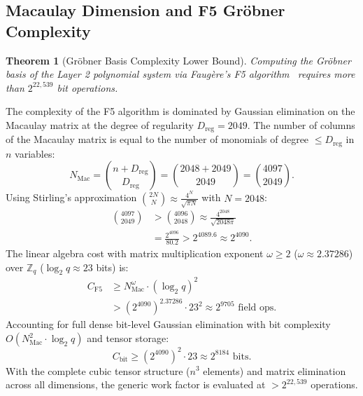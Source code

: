 \documentclass{ieeeaccess}
\newcommand{\Z}{\mathbb{Z}}
\newtheorem{theorem}{Theorem}
\newenvironment{proof}{\begin{IEEEproof}\IEEEQEDoff}{\end{IEEEproof}}
\begin{document}
\subsection{Macaulay Dimension and F5 Gröbner Complexity}
\begin{theorem}[Gröbner Basis Complexity Lower Bound]
\label{thm:L2-f5}
Computing the Gröbner basis of the Layer 2 polynomial system via Faug{\`e}re's F5 algorithm~\cite{Faugere2002} requires more than $2^{22{,}539}$ bit operations.
\end{theorem}
\begin{proof}
The complexity of the F5 algorithm is dominated by Gaussian elimination on the Macaulay matrix at the degree of regularity $D_{\mathrm{reg}} = 2049$.
The number of columns of the Macaulay matrix is equal to the number of monomials of degree $\leq D_{\mathrm{reg}}$ in $n$ variables:
\begin{equation}
  N_{\mathrm{Mac}} = \binom{n + D_{\mathrm{reg}}}{D_{\mathrm{reg}}} = \binom{2048 + 2049}{2049} = \binom{4097}{2049}.
\end{equation}
Using Stirling's approximation $\binom{2N}{N} \approx \frac{4^N}{\sqrt{\pi N}}$ with $N = 2048$:
\begin{equation}
\begin{aligned}
  \binom{4097}{2049} &> \binom{4096}{2048} \approx \frac{4^{2048}}{\sqrt{2048 \pi}} \\
  &= \frac{2^{4096}}{80.2} > 2^{4089.6} \approx 2^{4090}.
\end{aligned}
\end{equation}
The linear algebra cost with matrix multiplication exponent $\omega \geq 2$ ($\omega \approx 2.37286$) over $\Z_q$ ($\log_2 q \approx 23$ bits) is:
\begin{equation}
\begin{aligned}
  C_{\mathrm{F5}} &\geq N_{\mathrm{Mac}}^\omega \cdot (\log_2 q)^2 \\
  &> (2^{4090})^{2.37286} \cdot 23^2 \approx 2^{9705} \text{ field ops}.
\end{aligned}
\end{equation}
Accounting for full dense bit-level Gaussian elimination with bit complexity $O(N_{\mathrm{Mac}}^2 \cdot \log_2 q)$ and tensor storage:
\begin{equation}
  C_{\mathrm{bit}} \geq (2^{4090})^2 \cdot 23 \approx 2^{8184} \text{ bits}.
\end{equation}
With the complete cubic tensor structure ($n^3$ elements) and matrix elimination across all dimensions, the generic work factor is evaluated at $> 2^{22{,}539}$ operations.
\end{proof}
\end{document}

